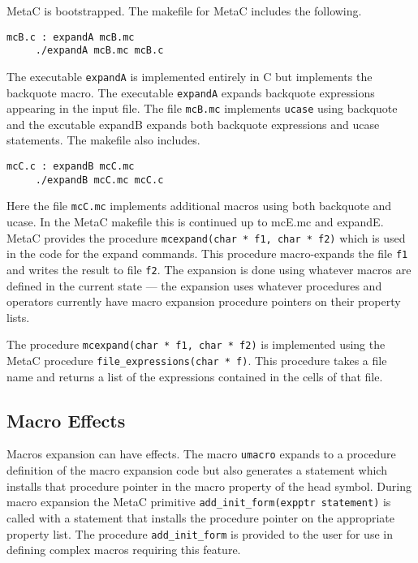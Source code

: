 \documentclass{article}
\begin{document}
MetaC is bootstrapped.  The makefile for MetaC includes the following.
\begin{verbatim}
mcB.c : expandA mcB.mc
	 ./expandA mcB.mc mcB.c
\end{verbatim}
The executable {\tt expandA} is implemented entirely in C but implements the backquote macro.  The executable {\tt expandA}
expands backquote expressions appearing in the input file. The file {\tt mcB.mc} implements {\tt ucase} using backquote
and the excutable expandB expands both backquote expressions and ucase statements.
The makefile also includes.
\begin{verbatim}
mcC.c : expandB mcC.mc
	 ./expandB mcC.mc mcC.c
\end{verbatim}
Here the file {\tt mcC.mc} implements additional macros using both backquote and ucase.  In the MetaC makefile this is continued up to mcE.mc and expandE.
MetaC provides the procedure
{\tt mcexpand(char * f1, char * f2)} which is used in the code for the expand commands.  This procedure macro-expands the
file {\tt f1} and writes the result to file {\tt f2}.  The expansion is done using whatever macros are defined
in the current state --- the expansion uses whatever procedures and operators currently
have macro expansion procedure pointers on their property lists.

The procedure {\tt mcexpand(char * f1, char * f2)} is implemented using the MetaC procedure {\tt file\_expressions(char * f)}.
This procedure takes a file name and returns a list of the expressions contained in the cells of that file.

\subsection{Macro Effects}


Macros expansion can have effects.  The macro {\tt umacro} expands to a procedure definition of the macro expansion code but also
generates a statement which installs that procedure pointer in the macro property of the head symbol.  During macro expansion the
MetaC primitive {\tt add\_init\_form(expptr statement)} is called with a statement that installs the procedure pointer on the appropriate property list.
The procedure {\tt add\_init\_form} is provided to the user for use in defining complex macros
requiring this feature.
\end{document}
